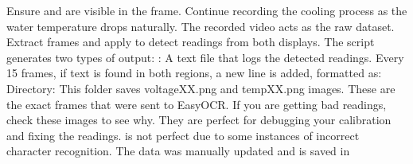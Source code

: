 \markdownRendererUlItem Ensure  and  are visible in the frame.\markdownRendererUlItemEnd 
\markdownRendererUlEndTight \markdownRendererOlItemEnd 
{}\markdownRendererInterblockSeparator
{}\markdownRendererUlBeginTight
\markdownRendererUlItem Continue recording the cooling process as the water temperature drops naturally.\markdownRendererUlItemEnd 
\markdownRendererUlEndTight \markdownRendererOlItemEnd 
{}\markdownRendererInterblockSeparator
{}\markdownRendererUlBeginTight
\markdownRendererUlItem The recorded video acts as the raw dataset.\markdownRendererUlItemEnd 
\markdownRendererUlItem Extract frames and apply  to detect readings from both displays.\markdownRendererUlItemEnd 
\markdownRendererUlEndTight \markdownRendererOlItemEnd 
\markdownRendererOlEnd \markdownRendererParagraphSeparator
{}
\markdownRendererSectionEnd \markdownRendererSectionBegin
{}\markdownRendererInterblockSeparator
{}The script generates two types of output:\markdownRendererInterblockSeparator
{}\markdownRendererUlBegin
\markdownRendererUlItem {}: A text file that logs the detected readings. Every 15 frames, if text is found in both regions, a new line is added, formatted as: \markdownRendererUlItemEnd 
\markdownRendererUlItem {} Directory: This folder saves voltageXX.png and tempXX.png images. These are the exact frames that were sent to EasyOCR. If you are getting bad readings, check these images to see why. They are perfect for debugging your calibration and fixing the readings.\markdownRendererUlItemEnd 
\markdownRendererUlEnd \markdownRendererInterblockSeparator
{} is not perfect due to some instances of incorrect character recognition. The data was manually updated and is saved in 
\markdownRendererSectionEnd 
\markdownRendererSectionEnd \markdownRendererDocumentEnd